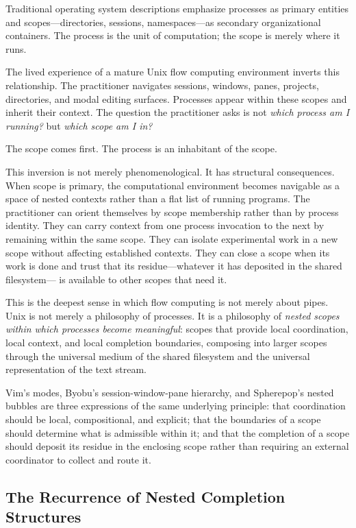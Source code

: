 \documentclass[12pt, a4paper]{article}
\begin{document}
Traditional operating system descriptions emphasize processes
as primary entities and scopes---directories, sessions,
namespaces---as secondary organizational containers. The process
is the unit of computation; the scope is merely where it runs.

The lived experience of a mature Unix flow computing environment
inverts this relationship. The practitioner navigates sessions,
windows, panes, projects, directories, and modal editing
surfaces. Processes appear within these scopes and inherit
their context. The question the practitioner asks is not
\emph{which process am I running?} but \emph{which scope am I in?}

The scope comes first. The process is an inhabitant of the scope.

This inversion is not merely phenomenological. It has structural
consequences. When scope is primary, the computational environment
becomes navigable as a space of nested contexts rather than a
flat list of running programs. The practitioner can orient
themselves by scope membership rather than by process identity.
They can carry context from one process invocation to the next
by remaining within the same scope. They can isolate experimental
work in a new scope without affecting established contexts. They
can close a scope when its work is done and trust that its
residue---whatever it has deposited in the shared filesystem---
is available to other scopes that need it.

This is the deepest sense in which flow computing is not merely
about pipes. Unix is not merely a philosophy of processes. It
is a philosophy of \emph{nested scopes within which processes
become meaningful}: scopes that provide local coordination,
local context, and local completion boundaries, composing into
larger scopes through the universal medium of the shared
filesystem and the universal representation of the text stream.

Vim's modes, Byobu's session-window-pane hierarchy, and
Spherepop's nested bubbles are three expressions of the same
underlying principle: that coordination should be local,
compositional, and explicit; that the boundaries of a scope
should determine what is admissible within it; and that the
completion of a scope should deposit its residue in the
enclosing scope rather than requiring an external coordinator
to collect and route it.

\subsection{The Recurrence of Nested Completion Structures}
\end{document}
